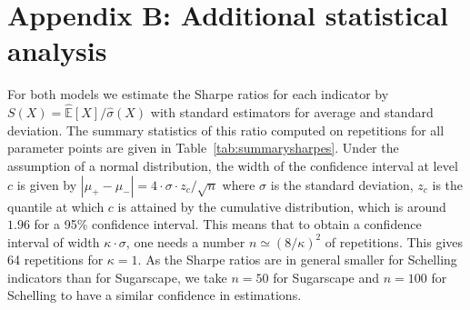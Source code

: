 \documentclass{JASSS}
\begin{document}
\section{Appendix B: Additional statistical analysis}

\label{app:convergence}







For both models we estimate the Sharpe ratios for each indicator by $S(X) = \hat{\mathbb{E}}\left[X\right]/\hat{\sigma}(X)$ with standard estimators for average and standard deviation. The summary statistics of this ratio computed on repetitions for all parameter points are given in Table~\ref{tab:summarysharpes}. Under the assumption of a normal distribution, the width of the confidence interval at level $c$ is given by $\left|\mu_+ - \mu_-\right| = 4\cdot \sigma \cdot z_{c} / \sqrt{n}$ where $\sigma$ is the standard deviation, $z_{c}$ is the quantile at which $c$ is attained by the cumulative distribution, which is around $1.96$ for a 95\% confidence interval. This means that to obtain a confidence interval of width $\kappa \cdot \sigma$, one needs a number $n \simeq (8 / \kappa )^2$ of repetitions. This gives 64 repetitions for $\kappa = 1$. As the Sharpe ratios are in general smaller for Schelling indicators than for Sugarscape, we take $n = 50$ for Sugarscape and $n = 100$ for Schelling to have a similar confidence in estimations.
\end{document}
